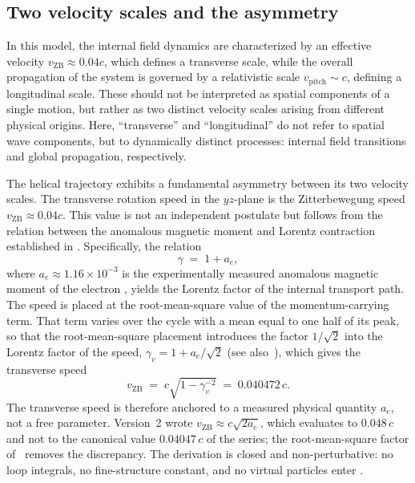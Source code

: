 \documentclass[%
 reprint, amsmath,amssymb, aps, prb, ]{revtex4-2}
\numberwithin{equation}{section}
\begin{document}
\subsection{Two velocity scales and the asymmetry}
\label{subsec:twovelocities}

In this model, the internal field dynamics are characterized by an effective velocity $v_{\mathrm{ZB}} \approx 0.04c$, which defines a transverse scale, while the overall propagation of the system is governed by a relativistic scale $v_{\mathrm{pitch}} \sim c$, defining a longitudinal scale. These should not be interpreted as spatial components of a single motion, but rather as two distinct velocity scales arising from different physical origins. Here, ``transverse'' and ``longitudinal'' do not refer to spatial wave components, but to dynamically distinct processes: internal field transitions and global propagation, respectively.

\vspace{5mm}

The helical trajectory exhibits a fundamental asymmetry between its two velocity scales. The transverse rotation speed in the $yz$-plane is the Zitterbewegung speed $v_{\mathrm{ZB}} \approx 0.04c$. This value is not an independent postulate but follows from the relation between the anomalous magnetic moment and Lorentz contraction established in \cite{hanamura10}. Specifically, the relation
\begin{equation}
\gamma \;=\; 1 + a_e,
\label{eq:gamma_ae}
\end{equation}
where $a_e \approx 1.16\times10^{-3}$ is the experimentally measured anomalous magnetic moment of the electron \cite{hanamura10, hanamura36}, yields the Lorentz factor of the internal transport path. The speed is placed at the root-mean-square value of the momentum-carrying term. That term varies over the cycle with a mean equal to one half of its peak, so that the root-mean-square placement introduces the factor $1/\sqrt{2}$ into the Lorentz factor of the speed, $\gamma_v = 1 + a_e/\sqrt{2}$ (see also~\cite{hanamura62}), which gives the transverse speed
\begin{equation}
v_{\mathrm{ZB}} \;=\; c\sqrt{1 - \gamma_v^{-2}} \;=\; 0.040472\,c.
\label{eq:vzb_from_ae}
\end{equation}
The transverse speed is therefore anchored to a measured physical quantity $a_e$, not a free parameter. Version~2 wrote $v_{\mathrm{ZB}} \approx c\sqrt{2a_e}$, which evaluates to $0.048\,c$ and not to the canonical value $0.04047\,c$ of the series; the root-mean-square factor of~\cite{hanamura62} removes the discrepancy. The derivation is closed and non-perturbative: no loop integrals, no fine-structure constant, and no virtual particles enter \cite{hanamura36}.
\end{document}
